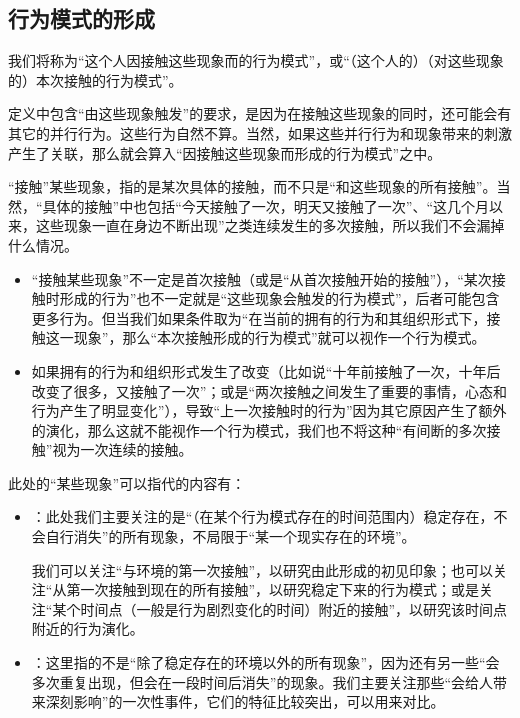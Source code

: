 \subsection{行为模式的形成}
我们将称为“这个人因接触这些现象而的行为模式”，或“（这个人的）（对这些现象的）本次接触的行为模式”。
\begin{explain}
定义中包含“由这些现象触发”的要求，是因为在接触这些现象的同时，还可能会有其它的并行行为。这些行为自然不算。当然，如果这些并行行为和现象带来的刺激产生了关联，那么就会算入“因接触这些现象而形成的行为模式”之中。

“接触”某些现象，指的是某次具体的接触，而不只是“和这些现象的所有接触”。当然，“具体的接触”中也包括“今天接触了一次，明天又接触了一次”、“这几个月以来，这些现象一直在身边不断出现”之类连续发生的多次接触，所以我们不会漏掉什么情况。
\begin{itemize}
\item “接触某些现象”不一定是首次接触（或是“从首次接触开始的接触”），“某次接触时形成的行为”也不一定就是“这些现象会触发的行为模式”，后者可能包含更多行为。但当我们如果条件取为“在当前的拥有的行为和其组织形式下，接触这一现象”，那么“本次接触形成的行为模式”就可以视作一个行为模式。
\item 如果拥有的行为和组织形式发生了改变（比如说“十年前接触了一次，十年后改变了很多，又接触了一次”；或是“两次接触之间发生了重要的事情，心态和行为产生了明显变化”），导致“上一次接触时的行为”因为其它原因产生了额外的演化，那么这就不能视作一个行为模式，我们也不将这种“有间断的多次接触”视为一次连续的接触。
\end{itemize}
\insertparanotes
此处的“某些现象”可以指代的内容有：
\begin{itemize}
\item {}：此处我们主要关注的是“（在某个行为模式存在的时间范围内）稳定存在，不会自行消失”的所有现象，不局限于“某一个现实存在的环境”。

我们可以关注“与环境的第一次接触”，以研究由此形成的初见印象；也可以关注“从第一次接触到现在的所有接触”，以研究稳定下来的行为模式；或是关注“某个时间点（一般是行为剧烈变化的时间）附近的接触”，以研究该时间点附近的行为演化。
\item {}：这里指的不是“除了稳定存在的环境以外的所有现象”，因为还有另一些“会多次重复出现，但会在一段时间后消失”的现象。我们主要关注那些“会给人带来深刻影响”的一次性事件，它们的特征比较突出，可以用来对比。


\end{itemize}
\end{explain}
